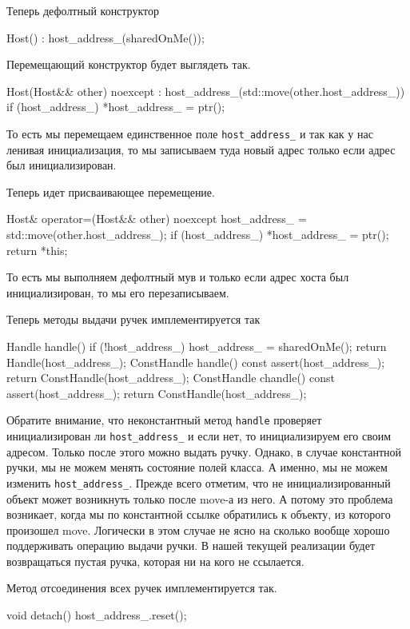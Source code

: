 Теперь дефолтный конструктор
\begin{cppcode}
  Host() : host_address_(sharedOnMe());
\end{cppcode}
Перемещающий конструктор будет выглядеть так.
\begin{cppcode}
  Host(Host&& other) noexcept 
  : host_address_(std::move(other.host_address_)) {
    if (host_address_)
      *host_address_ = ptr();
  } 
\end{cppcode}
То есть мы перемещаем единственное поле \verb"host_address_" и так как у нас ленивая инициализация, то мы записываем туда новый адрес только если адрес был инициализирован.

Теперь идет присваивающее перемещение.
\begin{cppcode}
Host& operator=(Host&& other) noexcept {
  host_address_ = std::move(other.host_address_);
  if (host_address_)
    *host_address_ = ptr();
  return *this;
}
\end{cppcode}
То есть мы выполняем дефолтный мув и только если адрес хоста был инициализирован, то мы его перезаписываем.

Теперь методы выдачи ручек имплементируется так
\begin{cppcode}
Handle handle() {
  if (!host_address_)
    host_address_ = sharedOnMe();
  return Handle(host_address_);
}
ConstHandle handle() const {
  assert(host_address_);
  return ConstHandle(host_address_);
}
ConstHandle chandle() const {
  assert(host_address_);
  return ConstHandle(host_address_);
}
\end{cppcode}
Обратите внимание, что неконстантный метод \verb"handle" проверяет инициализирован ли \verb"host_address_" и если нет, то инициализируем его своим адресом.
Только после этого можно выдать ручку.
Однако, в случае константной ручки, мы не можем менять состояние полей класса.
А именно, мы не можем изменить \verb"host_address_".
Прежде всего отметим, что не инициализированный объект может возникнуть только после move-а из него.
А потому это проблема возникает, когда мы по константной ссылке обратились к объекту, из которого произошел move.
Логически в этом случае не ясно на сколько вообще хорошо поддерживать операцию выдачи ручки.
В нашей текущей реализации будет возвращаться пустая ручка, которая ни на кого не ссылается.

Метод отсоединения всех ручек имплементируется так.
\begin{cppcode}
void detach() {
  host_address_.reset();
}
\end{cppcode}


